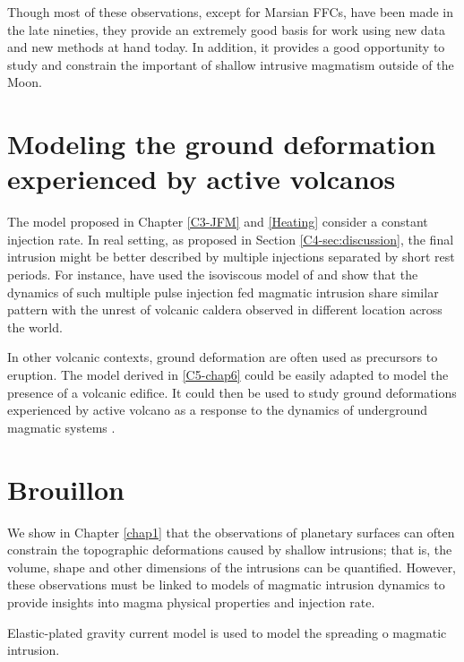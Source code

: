 Though most of these observations,  except for Marsian FFCs, have been
made in  the late nineties, they  provide an extremely good  basis for
work using  new data and  new methods at  hand today. In  addition, it
provides a  good opportunity to  study and constrain the  important of
shallow intrusive magmatism outside of the Moon.

\section{Modeling  the   ground  deformation  experienced   by  active
  volcanos}
\label{sec:caref-descr-tip}

The model proposed in  Chapter \ref{C3-JFM} and \ref{Heating} consider
a constant  injection rate.  In  real setting, as proposed  in Section
\ref{C4-sec:discussion}, the final intrusion might be better described
by multiple injections separated by  short rest periods. For instance,
\citet{Macedonio:2014et}   have   used   the   isoviscous   model   of
\citet{Michaut:2011kg}  and show  that the  dynamics of  such multiple
pulse injection fed magmatic intrusion  share similar pattern with the
unrest of volcanic  caldera observed in different  location across the
world.

In  other volcanic  contexts,  ground deformation  are  often used  as
precursors to eruption.  The model derived in  \ref{C5-chap6} could be
easily adapted to model the presence  of a volcanic edifice.  It could
then  be  used to  study  ground  deformations experienced  by  active
volcano as a response to  the dynamics of underground magmatic systems
\citep{Cayol:2014vo,Pedersen:2004kp,Patane:2006hn,Bonaccorso:2001iw,ChadwickJr:1995cz,Cannavo:2015fk}.


\section{Brouillon}

We  show in  Chapter \ref{chap1}  that the  observations of  planetary
surfaces can  often constrain  the topographic deformations  caused by
shallow intrusions; that is, the volume, shape and other dimensions of
the intrusions can be quantified.  However, these observations must be
linked to  models of magmatic  intrusion dynamics to  provide insights
into magma physical properties and injection rate.


Elastic-plated gravity current model is  used to model the spreading o
magmatic intrusion.

